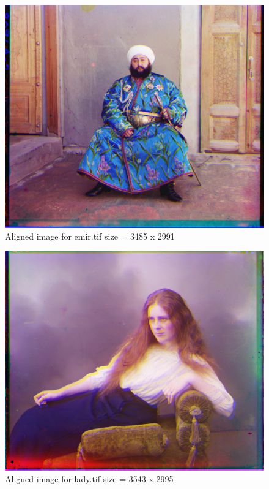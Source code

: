 \documentclass[10pt,letterpaper]{article}
\begin{document}
\begin{figure}
\centering
\includegraphics[width=\textwidth,height=\textheight,keepaspectratio]{../output/large-images/emi-aligned.jpg}
\caption{Aligned image for emir.tif  size = 3485 x 2991}
\end{figure}

\begin{figure}
\centering
\includegraphics[width=\textwidth,height=\textheight,keepaspectratio]{../output/large-images/lad-aligned.jpg}
\caption{Aligned image for lady.tif size = 3543 x 2995 }
\end{figure}
\end{document}
